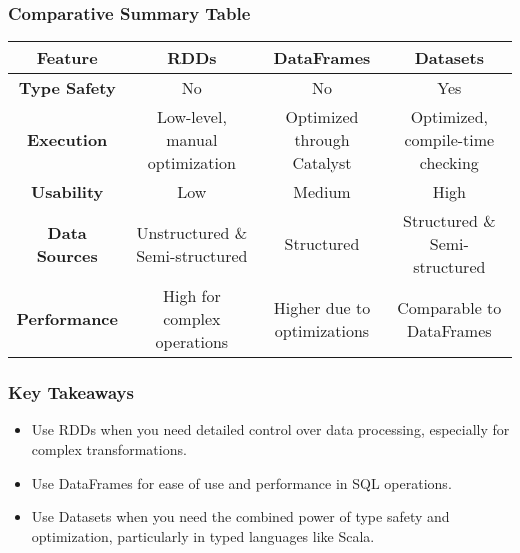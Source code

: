 \documentclass[aspectratio=169]{beamer}
\begin{document}
\begin{frame}
    \frametitle{Comparative Summary Table}
    \begin{table}[ht]
        \centering
        \begin{tabular}{|c|c|c|c|}
            \hline
            \textbf{Feature} & \textbf{RDDs} & \textbf{DataFrames} & \textbf{Datasets} \\
            \hline
            \textbf{Type Safety} & No & No & Yes \\
            \hline
            \textbf{Execution} & Low-level, manual optimization & Optimized through Catalyst & Optimized, compile-time checking \\
            \hline
            \textbf{Usability} & Low & Medium & High \\
            \hline
            \textbf{Data Sources} & Unstructured \& Semi-structured & Structured & Structured \& Semi-structured \\
            \hline
            \textbf{Performance} & High for complex operations & Higher due to optimizations & Comparable to DataFrames \\
            \hline
        \end{tabular}
    \end{table}
\end{frame}

\begin{frame}[fragile]
    \frametitle{Key Takeaways}
    \begin{itemize}
        \item Use RDDs when you need detailed control over data processing, especially for complex transformations.
        \item Use DataFrames for ease of use and performance in SQL operations.
        \item Use Datasets when you need the combined power of type safety and optimization, particularly in typed languages like Scala.
    \end{itemize}
\end{frame}
\end{document}
